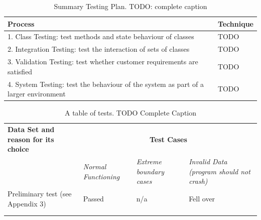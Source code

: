 \documentclass[11pt,a4paper]{article}
\begin{document}

\begin{table}[h!]
    \centering
    \caption{Summary Testing Plan. TODO: complete caption}
    \begin{tabular}[t]{|p{8cm}|p{7cm}|} \hline
        \textbf{Process} & \textbf{Technique} \\
        \hline 1. Class Testing: test methods and state behaviour of classes
                         & TODO \\
        \hline 2. Integration Testing: test the interaction of sets of classes
                            & TODO \\
        \hline 3. Validation Testing: test whether customer requirements are
        satisfied
                            & TODO \\ \hline 4. System Testing: test the behaviour of the system as part of a
        larger environment
                            & TODO \\
        \hline
    \end{tabular}
    \label{tab:test-plan}
\end{table}

\begin{table}[h!]
    \centering
    \caption{A table of tests. TODO Complete Caption}
    \begin{tabular}[t]{|p{5.5cm}|p{3cm}|p{3cm}|p{3cm}|} \hline \textbf{Data Set
        and reason for its choice} & \multicolumn{3}{c|}{\textbf{Test Cases}}\\
        \cline{2-4} & \emph{Normal Functioning} & \emph{Extreme boundary cases} &
        \emph{Invalid Data (program should not crash)} \\ \hline Preliminary test
        (see Appendix 3) & Passed & n/a & Fell over \\\hline &&&\\ \hline
                         &&&\\ \hline
    \end{tabular}
    \label{tab:tests}
\end{table}
\end{document}
